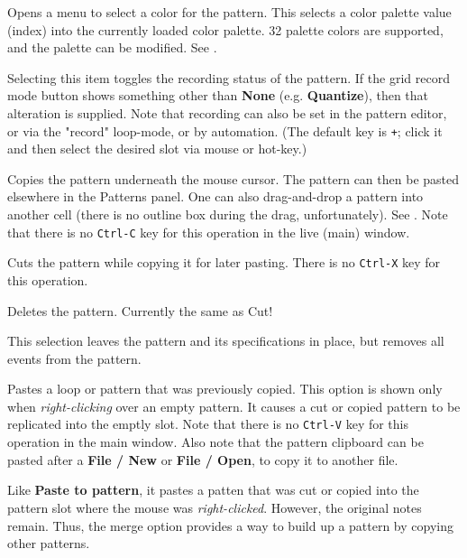    Opens a menu to select a color for the pattern.  This selects a color
   palette value (index) into the currently loaded color palette.
   32 palette colors are supported, and the palette can be modified.
   See .

   Selecting this item toggles the recording status of the pattern.
   If the grid record mode button shows something other than
   \textbf{None} (e.g. \textbf{Quantize}), then that alteration is supplied.
   Note that recording can also be set in the pattern editor, or via
   the "record" loop-mode, or by automation.
   (The default key is \texttt{+}; click it and then select the
   desired slot via mouse or hot-key.)

   Copies the pattern underneath the mouse cursor.
   The pattern can then be pasted elsewhere in the Patterns panel.
   One can also drag-and-drop a pattern into another cell (there is no outline
   box during the drag, unfortunately).
   See .
   Note that there is no \texttt{Ctrl-C} key for this operation in the
   live (main) window.

   Cuts the pattern while copying it for later pasting.
   There is no \texttt{Ctrl-X} key for this operation.

   Deletes the pattern.  Currently the same as Cut!

   This selection leaves the pattern and its specifications in place,
   but removes all events from the pattern.

   Pastes a loop or pattern that was previously copied.
   This option is shown only when
   \textsl{right-clicking} over an empty pattern.
   It causes a cut or copied pattern to be replicated into the emptly slot.
   Note that there is no \texttt{Ctrl-V} key for this operation in the
   main window.
   Also note that the pattern clipboard can be pasted after a
   \textbf{File / New} or \textbf{File / Open},
   to copy it to another file.

   Like \textbf{Paste to pattern}, it pastes a
   patten that was cut or copied into the pattern slot where the mouse was
   \textsl{right-clicked}.  However, the original notes remain.  Thus, the merge
   option provides a way to build up a pattern by copying other patterns.

